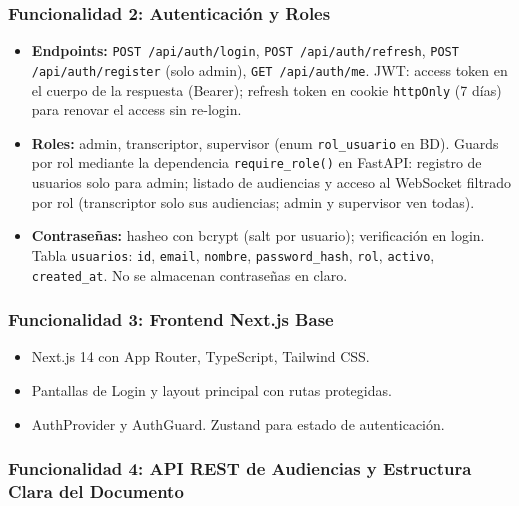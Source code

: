 \documentclass[12pt,a4paper]{report}
\begin{document}
\subsubsection{Funcionalidad 2: Autenticación y Roles}

\begin{itemize}
    \item \textbf{Endpoints:} \texttt{POST /api/auth/login}, \texttt{POST /api/auth/refresh}, \texttt{POST /api/auth/register} (solo admin), \texttt{GET /api/auth/me}. JWT: access token en el cuerpo de la respuesta (Bearer); refresh token en cookie \texttt{httpOnly} (7 días) para renovar el access sin re-login.
    \item \textbf{Roles:} admin, transcriptor, supervisor (enum \texttt{rol\_usuario} en BD). Guards por rol mediante la dependencia \texttt{require\_role()} en FastAPI: registro de usuarios solo para admin; listado de audiencias y acceso al WebSocket filtrado por rol (transcriptor solo sus audiencias; admin y supervisor ven todas).
    \item \textbf{Contraseñas:} hasheo con bcrypt (salt por usuario); verificación en login. Tabla \texttt{usuarios}: \texttt{id}, \texttt{email}, \texttt{nombre}, \texttt{password\_hash}, \texttt{rol}, \texttt{activo}, \texttt{created\_at}. No se almacenan contraseñas en claro.
\end{itemize}

\subsubsection{Funcionalidad 3: Frontend Next.js Base}

\begin{itemize}
    \item Next.js 14 con App Router, TypeScript, Tailwind CSS.
    \item Pantallas de Login y layout principal con rutas protegidas.
    \item AuthProvider y AuthGuard. Zustand para estado de autenticación.
\end{itemize}

\subsubsection{Funcionalidad 4: API REST de Audiencias y Estructura Clara del Documento}
\end{document}
